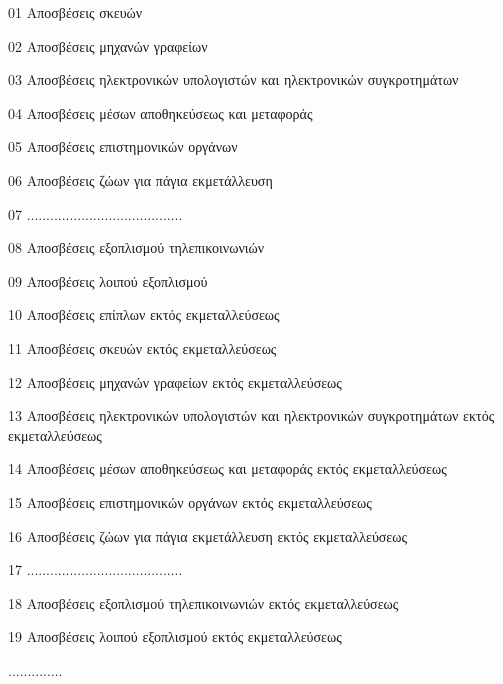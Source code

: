 \documentclass[A4,10pt,greek]{book}
\begin{document}
                               01    Αποσβέσεις σκευών

                               02    Αποσβέσεις μηχανών γραφείων

                               03    Αποσβέσεις ηλεκτρονικών υπολογιστών και ηλεκτρονικών
                                       συγκροτημάτων

                               04    Αποσβέσεις μέσων αποθηκεύσεως και μεταφοράς

                               05    Αποσβέσεις επιστημονικών οργάνων

                               06    Αποσβέσεις ζώων για πάγια εκμετάλλευση

                               07    ........................................

                               08    Αποσβέσεις εξοπλισμού τηλεπικοινωνιών

                               09    Αποσβέσεις λοιπού εξοπλισμού

                               10    Αποσβέσεις επίπλων εκτός εκμεταλλεύσεως

                               11    Αποσβέσεις σκευών εκτός εκμεταλλεύσεως

                               12    Αποσβέσεις μηχανών γραφείων εκτός εκμεταλλεύσεως

                               13    Αποσβέσεις ηλεκτρονικών υπολογιστών και ηλεκτρονικών
                                       συγκροτημάτων εκτός εκμεταλλεύσεως

                               14    Αποσβέσεις μέσων αποθηκεύσεως και μεταφοράς
                                       εκτός εκμεταλλεύσεως

                               15    Αποσβέσεις επιστημονικών οργάνων εκτός εκμεταλλεύσεως

                               16    Αποσβέσεις ζώων για πάγια εκμετάλλευση εκτός
                                       εκμεταλλεύσεως

                               17    ........................................

                               18    Αποσβέσεις εξοπλισμού τηλεπικοινωνιών εκτός
                                       εκμεταλλεύσεως

                               19    Αποσβέσεις λοιπού εξοπλισμού εκτός εκμεταλλεύσεως

                     ..............
\end{document}
